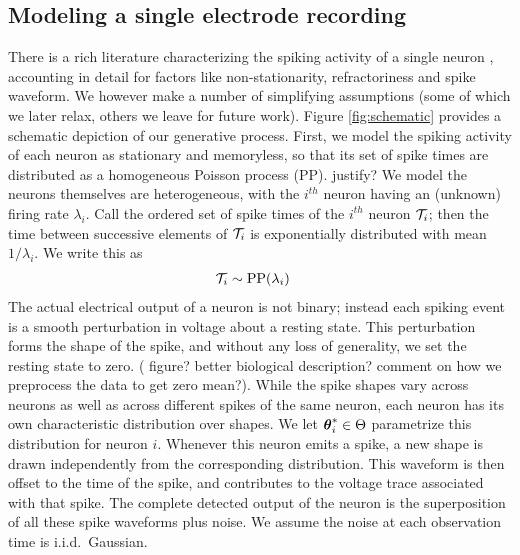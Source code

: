 \vspace{-.1in}
\subsection{Modeling a single electrode recording}
\vspace{-.1in}

There is a rich literature characterizing the spiking activity of a single neuron \citep{?}, accounting in detail for factors like non-stationarity, 
refractoriness and spike waveform. We however make a number of simplifying assumptions (some of which we later relax, others we leave
for future work). Figure \ref{fig:schematic} provides a schematic depiction of our generative process.
First, we model the spiking activity of each neuron as stationary and memoryless, so that its set of spike times are 
distributed as a homogeneous Poisson process (PP). 
{\color{red} justify?} We model the neurons themselves are heterogeneous, with the $i^{th}$ neuron having
an (unknown) firing rate $\lambda_i$. Call the ordered set of spike times of the $i^{th}$ neuron $\mathcal{T}_i$; then the time between successive elements of $\mathcal{T}_i$ is 
exponentially distributed with mean $1/\lambda_i$. We write this as
\vspace{-.1in}
\begin{align}
  \mathcal{T}_i &\sim \text{PP}(\lambda_i)
\end{align}
The actual electrical output of a neuron is not binary; instead each spiking event is a smooth perturbation in voltage about a
resting state. This perturbation forms the shape of the spike, and without any loss of generality, we set the resting state to zero. 
{(\color{red} figure? better biological description? comment on how we preprocess the data to get zero mean?)}. 
While the spike shapes vary across neurons as well as across different spikes of the same neuron, each 
neuron has its own characteristic distribution over shapes. 
We let $\boldsymbol{\theta}^*_i \in \Theta$ parametrize this distribution for neuron $i$.
Whenever this neuron emits a 
spike, a new shape is drawn independently from the corresponding distribution. %
This waveform is then offset to the time of the spike, and contributes to the voltage trace associated with that spike. The complete detected output of the neuron is the 
superposition of all these spike waveforms plus noise.  
We assume the noise at each observation time is i.i.d.\ Gaussian.


